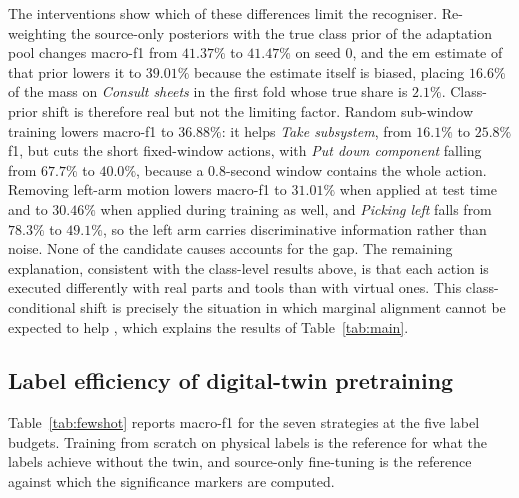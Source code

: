 \documentclass[]{interact}
\begin{document}
The interventions show which of these differences limit the recogniser.
Re-weighting the source-only posteriors with the true class prior of the
adaptation pool changes macro-\ac{f1} from $41.37\%$ to $41.47\%$ on seed 0,
and the \ac{em} estimate of that prior lowers it to $39.01\%$ because the
estimate itself is biased, placing $16.6\%$ of the mass on
\emph{Consult sheets} in the first fold whose true share is $2.1\%$. Class-prior shift is
therefore real but not the limiting factor. Random sub-window training lowers
macro-\ac{f1} to $36.88\%$: it helps \emph{Take subsystem}, from $16.1\%$ to
$25.8\%$ \ac{f1}, but cuts the short fixed-window actions, with
\emph{Put down component} falling from $67.7\%$ to $40.0\%$, because a
0.8-second window contains the whole action. Removing left-arm motion lowers
macro-\ac{f1} to $31.01\%$ when applied at test time and to $30.46\%$ when
applied during training as well, and \emph{Picking left} falls from $78.3\%$
to $49.1\%$, so the left arm carries discriminative information rather than
noise. None of the candidate causes accounts for the gap. The remaining
explanation, consistent with the class-level results above, is that each
action is executed differently with real parts and tools than with virtual
ones. This class-conditional shift is precisely the situation in which
marginal alignment cannot be expected to help \citep{zhao2019invariant}, which
explains the results of Table~\ref{tab:main}.

\subsection{Label efficiency of digital-twin pretraining}
\label{sec:label-budget}

Table~\ref{tab:fewshot} reports macro-\ac{f1} for the seven strategies at the
five label budgets. Training from scratch on physical labels is the reference
for what the labels achieve without the twin, and source-only fine-tuning is
the reference against which the significance markers are computed.
\end{document}

